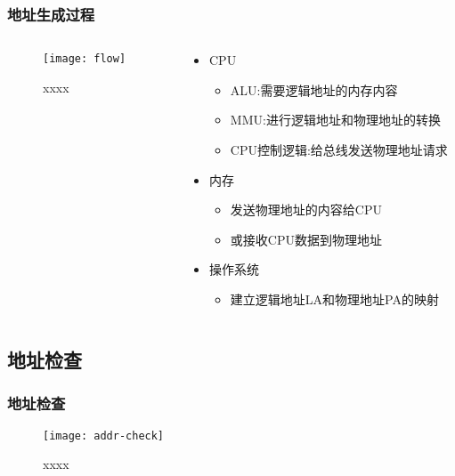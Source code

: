 \begin{frame}[plain,t]
    
    \frametitle{地址生成过程}
    
	\begin{columns}
	    \begin{column}{0.5\textwidth}
		    \begin{figure}
		        \centering
		        \texttt{[image: flow]}
		        \caption{xxxx}
		    \end{figure}
	    \end{column}
	    \begin{column}{0.5\textwidth}
			\begin{itemize}
			    \item CPU
			    \begin{itemize}
			        \item ALU:需要逻辑地址的内存内容
			        \item MMU:进行逻辑地址和物理地址的转换
			        \item CPU控制逻辑:给总线发送物理地址请求
			    \end{itemize}
			    \item 内存
			    \begin{itemize}
			        \item 发送物理地址的内容给CPU
			        \item 或接收CPU数据到物理地址
			    \end{itemize}
			    \item 操作系统
			    \begin{itemize}
			        \item 建立逻辑地址LA和物理地址PA的映射
			    \end{itemize}
			\end{itemize}
	    \end{column}
	\end{columns}
    
\end{frame}
\subsection{地址检查} %
\begin{frame}[plain,t]
    
    \frametitle{地址检查}
    
    \begin{figure}
        \centering
        \texttt{[image: addr-check]}
        \caption{xxxx}
    \end{figure}
    
\end{frame}


